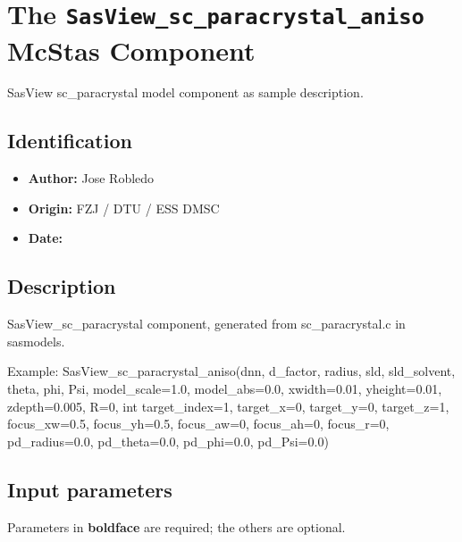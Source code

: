 \section{The \texttt{SasView\_sc\_paracrystal\_aniso} McStas Component}
SasView sc\_paracrystal model component as sample description.

\subsection*{Identification}
\begin{itemize}
  \item \textbf{Author:} Jose Robledo
  \item \textbf{Origin:} FZJ / DTU / ESS DMSC
  \item \textbf{Date:} 
\end{itemize}

\subsection*{Description}
SasView\_sc\_paracrystal component, generated from sc\_paracrystal.c in sasmodels.

Example: SasView\_sc\_paracrystal\_aniso(dnn, d\_factor, radius, sld, sld\_solvent, theta, phi, Psi, model\_scale=1.0, model\_abs=0.0, xwidth=0.01, yheight=0.01, zdepth=0.005, R=0, int target\_index=1, target\_x=0, target\_y=0, target\_z=1, focus\_xw=0.5, focus\_yh=0.5, focus\_aw=0, focus\_ah=0, focus\_r=0, pd\_radius=0.0, pd\_theta=0.0, pd\_phi=0.0, pd\_Psi=0.0)

\subsection*{Input parameters}
Parameters in \textbf{boldface} are required; the others are optional.

